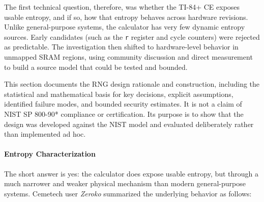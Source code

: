 \documentclass[titlepage]{report}
\begin{document}
	The first technical question, therefore, was whether the TI-84+ CE exposes usable entropy, and if so, how that entropy behaves across hardware revisions. Unlike general-purpose systems, the calculator has very few dynamic entropy sources. Early candidates (such as the \texttt{r} register and cycle counters) were rejected as predictable. The investigation then shifted to hardware-level behavior in unmapped SRAM regions, using community discussion and direct measurement to build a source model that could be tested and bounded.

	This section documents the RNG design rationale and construction, including the statistical and mathematical basis for key decisions, explicit assumptions, identified failure modes, and bounded security estimates. It is not a claim of NIST SP 800-90* compliance or certification. Its purpose is to show that the design was developed against the NIST model and evaluated deliberately rather than implemented ad hoc.

	\paragraph{Entropy Characterization}
	The short answer is yes: the calculator does expose usable entropy, but through a much narrower and weaker physical mechanism than modern general-purpose systems. Cemetech user \textit{Zeroko} summarized the underlying behavior as follows:
	
\end{document}
